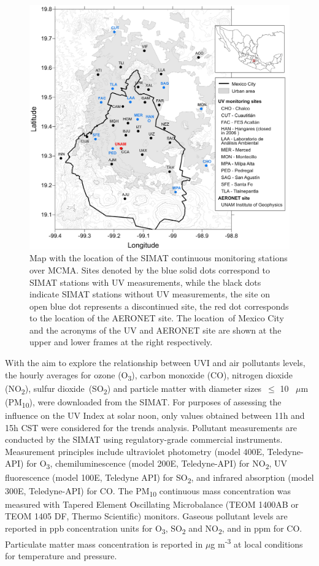 \documentclass[journal=jacsat,manuscript=article]{achemso}
\begin{document}
\begin{figure}[H]
  \begin{center}
    \includegraphics[width=0.70\columnwidth]{figures/map}
    \caption{{Map with the location of the SIMAT continuous monitoring stations over
          MCMA. Sites denoted by the blue solid dots correspond to SIMAT stations
          with UV measurements, while the black dots indicate SIMAT stations
          without UV measurements, the site on open blue dot represents a
          discontinued site, the red dot corresponds to the location of the
          AERONET site. The location~of Mexico City and the acronyms of the UV and
          AERONET site are shown at the upper and lower frames at the right
          respectively.
            {\label{fig:map}}%
        }}
  \end{center}
\end{figure}

With the aim to explore the relationship between UVI and air pollutants
levels, the hourly averages for ozone (O\textsubscript{3}), carbon
monoxide (CO), nitrogen dioxide (NO\textsubscript{2}), sulfur
dioxide~(SO\textsubscript{2}) and particle matter with diameter
sizes~\(\le\) 10 ~$\mu$m (PM\textsubscript{10}), were downloaded
from the SIMAT.\cite{atmosfrico} For purposes of assessing the
influence on the UV Index at solar noon, only values obtained between
11h and 15h CST were considered for the trends analysis. Pollutant
measurements are conducted by the SIMAT using regulatory-grade
commercial instruments. Measurement principles include ultraviolet
photometry (model 400E, Teledyne-API) for O\textsubscript{3},
chemiluminescence (model 200E, Teledyne-API) for NO\textsubscript{2}, UV
fluorescence (model 100E, Teledyne API) for SO\textsubscript{2}, and
infrared absorption (model 300E, Teledyne-API) for CO. The
PM\textsubscript{10} continuous mass concentration was measured with
Tapered Element Oscillating Microbalance (TEOM 1400AB or TEOM 1405 DF,
Thermo Scientific) monitors. Gaseous pollutant levels are reported in
ppb concentration units for O\textsubscript{3}, SO\textsubscript{2} and
NO\textsubscript{2}, and in ppm for CO. Particulate matter mass
concentration is reported in $\mu$g m\textsuperscript{-3} at local
conditions for temperature and pressure.
\end{document}
